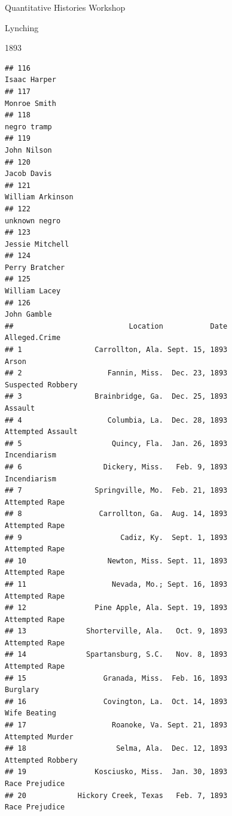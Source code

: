 \documentclass[
  ignorenonframetext,
]{beamer}
\begin{document}
\begin{frame}[fragile]{Quantitative Histories Workshop}
\begin{block}{Lynching}
\begin{block}{1893}
\begin{verbatim}
## 116                                                                  Isaac Harper
## 117                                                                  Monroe Smith
## 118                                                                   negro tramp
## 119                                                                   John Nilson
## 120                                                                   Jacob Davis
## 121                                                              William Arkinson
## 122                                                                 unknown negro
## 123                                                               Jessie Mitchell
## 124                                                                Perry Bratcher
## 125                                                                 William Lacey
## 126                                                                   John Gamble
##                           Location           Date                Alleged.Crime
## 1                 Carrollton, Ala. Sept. 15, 1893                        Arson
## 2                    Fannin, Miss.  Dec. 23, 1893            Suspected Robbery
## 3                 Brainbridge, Ga.  Dec. 25, 1893                      Assault
## 4                    Columbia, La.  Dec. 28, 1893            Attempted Assault
## 5                     Quincy, Fla.  Jan. 26, 1893                 Incendiarism
## 6                   Dickery, Miss.   Feb. 9, 1893                 Incendiarism
## 7                 Springville, Mo.  Feb. 21, 1893               Attempted Rape
## 8                  Carrollton, Ga.  Aug. 14, 1893               Attempted Rape
## 9                       Cadiz, Ky.  Sept. 1, 1893               Attempted Rape
## 10                   Newton, Miss. Sept. 11, 1893               Attempted Rape
## 11                    Nevada, Mo.; Sept. 16, 1893               Attempted Rape
## 12                Pine Apple, Ala. Sept. 19, 1893               Attempted Rape
## 13              Shorterville, Ala.   Oct. 9, 1893               Attempted Rape
## 14              Spartansburg, S.C.   Nov. 8, 1893               Attempted Rape
## 15                  Granada, Miss.  Feb. 16, 1893                     Burglary
## 16                  Covington, La.  Oct. 14, 1893                 Wife Beating
## 17                    Roanoke, Va. Sept. 21, 1893             Attempted Murder
## 18                     Selma, Ala.  Dec. 12, 1893            Attempted Robbery
## 19                Kosciusko, Miss.  Jan. 30, 1893               Race Prejudice
## 20            Hickory Creek, Texas   Feb. 7, 1893               Race Prejudice

\end{verbatim}
\end{block}
\end{block}
\end{frame}
\end{document}
